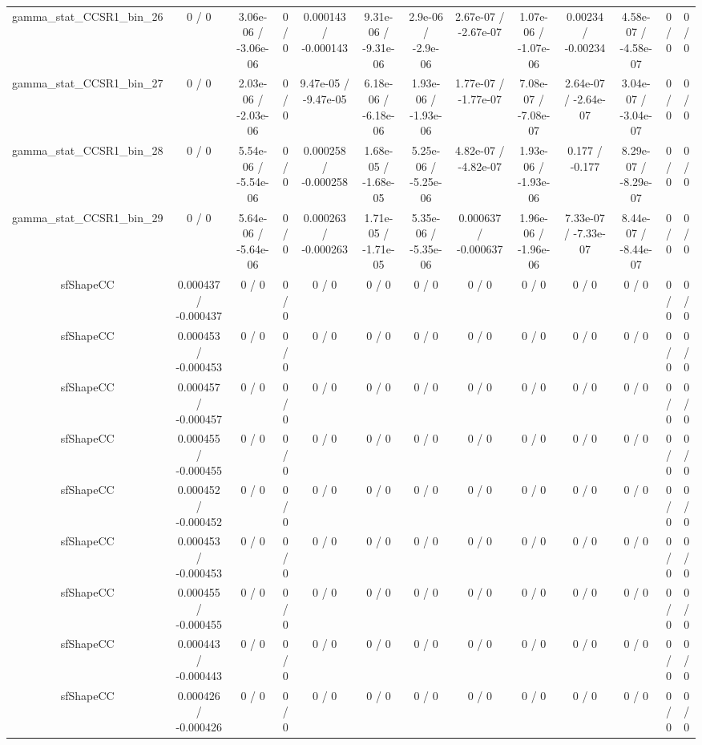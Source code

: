 \documentclass[10pt]{article}
\begin{document}
\begin{table}[htbp]
\begin{center}
\begin{tabular}{|c|c|c|c|c|c|c|c|c|c|c|c|c|}
  gamma_stat_CCSR1_bin_26 & 0 / 0 & 3.06e-06 / -3.06e-06 & 0 / 0 & 0.000143 / -0.000143 & 9.31e-06 / -9.31e-06 & 2.9e-06 / -2.9e-06 & 2.67e-07 / -2.67e-07 & 1.07e-06 / -1.07e-06 & 0.00234 / -0.00234 & 4.58e-07 / -4.58e-07 & 0 / 0 & 0 / 0 \\ 
  gamma_stat_CCSR1_bin_27 & 0 / 0 & 2.03e-06 / -2.03e-06 & 0 / 0 & 9.47e-05 / -9.47e-05 & 6.18e-06 / -6.18e-06 & 1.93e-06 / -1.93e-06 & 1.77e-07 / -1.77e-07 & 7.08e-07 / -7.08e-07 & 2.64e-07 / -2.64e-07 & 3.04e-07 / -3.04e-07 & 0 / 0 & 0 / 0 \\ 
  gamma_stat_CCSR1_bin_28 & 0 / 0 & 5.54e-06 / -5.54e-06 & 0 / 0 & 0.000258 / -0.000258 & 1.68e-05 / -1.68e-05 & 5.25e-06 / -5.25e-06 & 4.82e-07 / -4.82e-07 & 1.93e-06 / -1.93e-06 & 0.177 / -0.177 & 8.29e-07 / -8.29e-07 & 0 / 0 & 0 / 0 \\ 
  gamma_stat_CCSR1_bin_29 & 0 / 0 & 5.64e-06 / -5.64e-06 & 0 / 0 & 0.000263 / -0.000263 & 1.71e-05 / -1.71e-05 & 5.35e-06 / -5.35e-06 & 0.000637 / -0.000637 & 1.96e-06 / -1.96e-06 & 7.33e-07 / -7.33e-07 & 8.44e-07 / -8.44e-07 & 0 / 0 & 0 / 0 \\ 
  sfShapeCC & 0.000437 / -0.000437 & 0 / 0 & 0 / 0 & 0 / 0 & 0 / 0 & 0 / 0 & 0 / 0 & 0 / 0 & 0 / 0 & 0 / 0 & 0 / 0 & 0 / 0 \\ 
  sfShapeCC & 0.000453 / -0.000453 & 0 / 0 & 0 / 0 & 0 / 0 & 0 / 0 & 0 / 0 & 0 / 0 & 0 / 0 & 0 / 0 & 0 / 0 & 0 / 0 & 0 / 0 \\ 
  sfShapeCC & 0.000457 / -0.000457 & 0 / 0 & 0 / 0 & 0 / 0 & 0 / 0 & 0 / 0 & 0 / 0 & 0 / 0 & 0 / 0 & 0 / 0 & 0 / 0 & 0 / 0 \\ 
  sfShapeCC & 0.000455 / -0.000455 & 0 / 0 & 0 / 0 & 0 / 0 & 0 / 0 & 0 / 0 & 0 / 0 & 0 / 0 & 0 / 0 & 0 / 0 & 0 / 0 & 0 / 0 \\ 
  sfShapeCC & 0.000452 / -0.000452 & 0 / 0 & 0 / 0 & 0 / 0 & 0 / 0 & 0 / 0 & 0 / 0 & 0 / 0 & 0 / 0 & 0 / 0 & 0 / 0 & 0 / 0 \\ 
  sfShapeCC & 0.000453 / -0.000453 & 0 / 0 & 0 / 0 & 0 / 0 & 0 / 0 & 0 / 0 & 0 / 0 & 0 / 0 & 0 / 0 & 0 / 0 & 0 / 0 & 0 / 0 \\ 
  sfShapeCC & 0.000455 / -0.000455 & 0 / 0 & 0 / 0 & 0 / 0 & 0 / 0 & 0 / 0 & 0 / 0 & 0 / 0 & 0 / 0 & 0 / 0 & 0 / 0 & 0 / 0 \\ 
  sfShapeCC & 0.000443 / -0.000443 & 0 / 0 & 0 / 0 & 0 / 0 & 0 / 0 & 0 / 0 & 0 / 0 & 0 / 0 & 0 / 0 & 0 / 0 & 0 / 0 & 0 / 0 \\ 
  sfShapeCC & 0.000426 / -0.000426 & 0 / 0 & 0 / 0 & 0 / 0 & 0 / 0 & 0 / 0 & 0 / 0 & 0 / 0 & 0 / 0 & 0 / 0 & 0 / 0 & 0 / 0 \\ 

\end{tabular}
\end{center}
\end{table}
\end{document}
